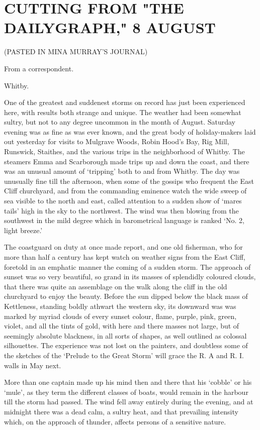 \chapter{CUTTING FROM "THE DAILYGRAPH," 8 AUGUST}

(PASTED IN MINA MURRAY'S JOURNAL) 

From a correspondent. 

Whitby. 

One of the greatest and suddenest storms on record has just been experienced here, with results both strange and unique. The weather had been somewhat sultry, but not to any degree uncommon in the month of August. Saturday evening was as fine as was ever known, and the great body of holiday-makers laid out yesterday for visits to Mulgrave Woods, Robin Hood's Bay, Rig Mill, Runswick, Staithes, and the various trips in the neighborhood of Whitby. The steamers Emma and Scarborough made trips up and down the coast, and there was an unusual amount of `tripping' both to and from Whitby. The day was unusually fine till the afternoon, when some of the gossips who frequent the East Cliff churchyard, and from the commanding eminence watch the wide sweep of sea visible to the north and east, called attention to a sudden show of `mares tails' high in the sky to the northwest. The wind was then blowing from the southwest in the mild degree which in barometrical language is ranked `No. 2, light breeze.' 

The coastguard on duty at once made report, and one old fisherman, who for more than half a century has kept watch on weather signs from the East Cliff, foretold in an emphatic manner the coming of a sudden storm. The approach of sunset was so very beautiful, so grand in its masses of splendidly coloured clouds, that there was quite an assemblage on the walk along the cliff in the old churchyard to enjoy the beauty. Before the sun dipped below the black mass of Kettleness, standing boldly athwart the western sky, its downward was was marked by myriad clouds of every sunset colour, flame, purple, pink, green, violet, and all the tints of gold, with here and there masses not large, but of seemingly absolute blackness, in all sorts of shapes, as well outlined as colossal silhouettes. The experience was not lost on the painters, and doubtless some of the sketches of the `Prelude to the Great Storm' will grace the R. A and R. I. walls in May next. 

More than one captain made up his mind then and there that his `cobble' or his `mule', as they term the different classes of boats, would remain in the harbour till the storm had passed. The wind fell away entirely during the evening, and at midnight there was a dead calm, a sultry heat, and that prevailing intensity which, on the approach of thunder, affects persons of a sensitive nature. 

